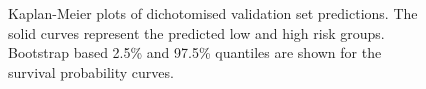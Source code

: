 \documentclass[letterpaper,12pt]{article}
\begin{document}
\begin{figure}[!th]
{}
\caption{Kaplan-Meier plots of dichotomised validation set predictions. The solid curves represent the predicted low and high risk groups. Bootstrap based 2.5\% and 97.5\% quantiles are shown for the survival probability curves.}
\label{Fig:PLSCoxKaplanMeier}
\end{figure}
\end{document}
